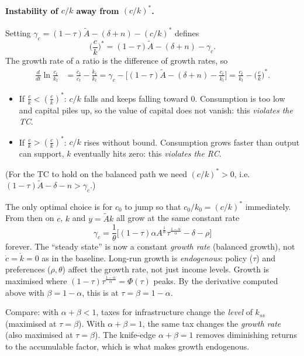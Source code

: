 \paragraph{Instability of $c/k$ away from $(c/k)^*$.} Setting $\gamma_c=(1-\tau)\tilde A-(\delta+n)-(c/k)^*$ defines
\[
\Big(\frac ck\Big)^*=(1-\tau)\tilde A-(\delta+n)-\gamma_c .
\]
The growth rate of a ratio is the difference of growth rates, so
\begin{align*}
\frac{d}{dt}\ln\frac{c_t}{k_t}&=\frac{\dot c_t}{c_t}-\frac{\dot k_t}{k_t}
=\gamma_c-\Big[(1-\tau)\tilde A-(\delta+n)-\frac{c_t}{k_t}\Big]
=\frac{c_t}{k_t}-\Big(\frac ck\Big)^* .
\end{align*}
\begin{itemize}
\item If $\frac ck<(\frac ck)^*$: $c/k$ falls and keeps falling toward 0. Consumption is too low and capital piles up, so the value of capital does not vanish: this \emph{violates the TC}.
\item If $\frac ck>(\frac ck)^*$: $c/k$ rises without bound. Consumption grows faster than output can support, $k$ eventually hits zero: this \emph{violates the RC}.
\end{itemize}
(For the TC to hold on the balanced path we need $(c/k)^*>0$, i.e.\ $(1-\tau)\tilde A-\delta-n>\gamma_c$.)

\begin{keybox}[title={AK growth with productive government: no transitional dynamics}]
The only optimal choice is for $c_0$ to jump so that $c_0/k_0=(c/k)^*$ immediately. From then on $c$, $k$ and $y=\tilde Ak$ all grow at the same constant rate
\[
\gamma_c=\frac1\theta\Big[(1-\tau)\alpha A^{\frac1\alpha}\tau^{\frac{1-\alpha}{\alpha}}-\delta-\rho\Big]
\]
forever. The ``steady state'' is now a constant \emph{growth rate} (balanced growth), not $\dot c=\dot k=0$ as in the baseline. Long-run growth is \emph{endogenous}: policy ($\tau$) and preferences ($\rho,\theta$) affect the growth rate, not just income levels. Growth is maximised where $(1-\tau)\tau^{\frac{1-\alpha}{\alpha}}=\Phi(\tau)$ peaks. By the derivative computed above with $\beta=1-\alpha$, this is at $\tau=\beta=1-\alpha$.
\end{keybox}
\begin{tipbox}
Compare: with $\alpha+\beta<1$, taxes for infrastructure change the \emph{level} of $k_{ss}$ (maximised at $\tau=\beta$). With $\alpha+\beta=1$, the same tax changes the \emph{growth rate} (also maximised at $\tau=\beta$). The knife-edge $\alpha+\beta=1$ removes diminishing returns to the accumulable factor, which is what makes growth endogenous.
\end{tipbox}
